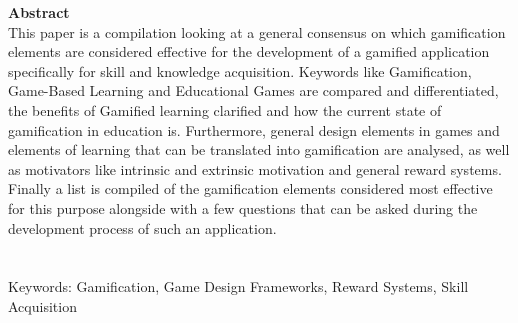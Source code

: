 \thispagestyle{plain}
\addtocounter{page}{-1}

\large
\noindent
\textbf{Abstract}\\

\small
This paper is a compilation looking at a general consensus on which gamification elements are considered effective for the development of a gamified application specifically for skill and knowledge acquisition. Keywords like Gamification, Game-Based Learning and Educational Games are compared and differentiated, the benefits of Gamified learning clarified and how the current state of gamification in education is. Furthermore, general design elements in games and elements of learning that can be translated into gamification are analysed, as well as motivators like intrinsic and extrinsic motivation and general reward systems. Finally a list is compiled of the gamification elements considered most effective for this purpose alongside with a few questions that can be asked during the development process of such an application.\\
\\
\\
Keywords: Gamification, Game Design Frameworks, Reward Systems, Skill Acquisition

\restoregeometry